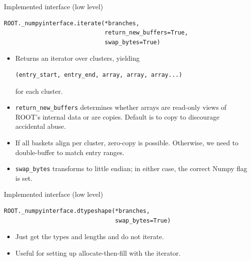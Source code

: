 \documentclass{beamer}
\begin{document}
\begin{frame}[fragile]{Implemented interface (low level)}
\vspace{0.5 cm}

\small
\begin{verbatim}
ROOT._numpyinterface.iterate(*branches,
                             return_new_buffers=True,
                             swap_bytes=True)
\end{verbatim}
\normalsize

\begin{itemize}
\item<1-> Returns an iterator over clusters, yielding
\small
\begin{verbatim}
(entry_start, entry_end, array, array, array...)
\end{verbatim}
\normalsize for each cluster.

\item<2-> {\tt\small return\_new\_buffers} determines whether arrays are read-only views of ROOT's internal data or are copies. Default is to copy to discourage accidental abuse.

\item<3-> If all baskets align per cluster, zero-copy is possible. Otherwise, we need to double-buffer to match entry ranges.

\item<4-> {\tt\small swap\_bytes} transforms to little endian; in either case, the correct Numpy flag is set.
\end{itemize}
\end{frame}

\begin{frame}[fragile]{Implemented interface (low level)}
\vspace{0.5 cm}
\small
\begin{verbatim}
ROOT._numpyinterface.dtypeshape(*branches,
                                swap_bytes=True)
\end{verbatim}
\normalsize

\begin{itemize}
\item Just get the types and lengths and do not iterate.

\item Useful for setting up allocate-then-fill with the iterator.
\end{itemize}
\end{frame}
\end{document}
